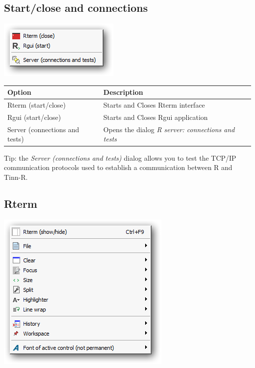 \hypertarget{menu_r_startcloseandconections}{}
\subsection{Start/close and connections}

\includegraphics[scale=0.50]{./res/menu_r_startcloseandconections.png}\\

\begin{scriptsize}\begin{tabularx}{\textwidth}{>{\hsize=0.5\hsize}X>{\hsize=0.7\hsize}X}\\
    \hline
    \textbf{Option} & \textbf{Description} \\
    \hline
    Rterm (start/close) & Starts and Closes Rterm interface \\
    Rgui (start/close) & Starts and Closes Rgui application \\
    Server (connections and tests) & Opens the dialog \textit{R server: connections and tests} \\
    \hline
  \end{tabularx}\end{scriptsize}

Tip: the \textit{Server (connections and tests)} dialog allows you to test the
TCP/IP communication protocols used to establish a communication between
R and Tinn-R.


\hypertarget{menu_r_rterm}{}
\subsection{Rterm}

\includegraphics[scale=0.50]{./res/menu_r_rterm.png}\\

